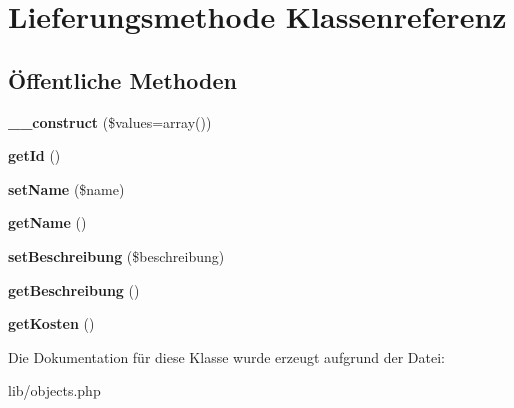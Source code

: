 \hypertarget{classLieferungsmethode}{\section{\-Lieferungsmethode \-Klassenreferenz}
\label{classLieferungsmethode}
}
\subsection*{Öffentliche \-Methoden}
\begin{DoxyCompactItemize}
\item 
\hypertarget{classLieferungsmethode_ad1d600b2622c967cfff2191f7b36422b}{{\bfseries \-\_\-\-\_\-construct} (\$values=array())}\label{classLieferungsmethode_ad1d600b2622c967cfff2191f7b36422b}

\item 
\hypertarget{classLieferungsmethode_a24e16684ae918d2d78dcea2f09c9623d}{{\bfseries get\-Id} ()}\label{classLieferungsmethode_a24e16684ae918d2d78dcea2f09c9623d}

\item 
\hypertarget{classLieferungsmethode_af3cd8c887aa29c755e762d543f1a393d}{{\bfseries set\-Name} (\$name)}\label{classLieferungsmethode_af3cd8c887aa29c755e762d543f1a393d}

\item 
\hypertarget{classLieferungsmethode_acdff00849db9d887688c5d5ed4c4a075}{{\bfseries get\-Name} ()}\label{classLieferungsmethode_acdff00849db9d887688c5d5ed4c4a075}

\item 
\hypertarget{classLieferungsmethode_afeea41a4a0efe68d6d4114445827ec3f}{{\bfseries set\-Beschreibung} (\$beschreibung)}\label{classLieferungsmethode_afeea41a4a0efe68d6d4114445827ec3f}

\item 
\hypertarget{classLieferungsmethode_ad4677caaee50fb9f25f7569a65300723}{{\bfseries get\-Beschreibung} ()}\label{classLieferungsmethode_ad4677caaee50fb9f25f7569a65300723}

\item 
\hypertarget{classLieferungsmethode_a3d617c5cfd6cf93a06a5399c47208513}{{\bfseries get\-Kosten} ()}\label{classLieferungsmethode_a3d617c5cfd6cf93a06a5399c47208513}

\end{DoxyCompactItemize}


\-Die \-Dokumentation für diese \-Klasse wurde erzeugt aufgrund der \-Datei\-:\begin{DoxyCompactItemize}
\item 
lib/objects.\-php\end{DoxyCompactItemize}
